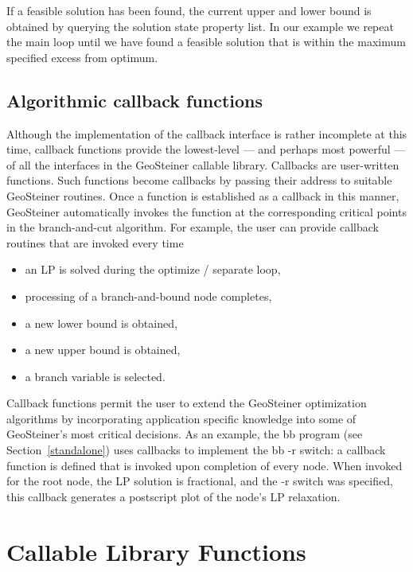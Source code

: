 \documentclass[12pt,twoside,letterpaper]{article}
\def\code#1{{\ttfamily #1}}
\def\geosteiner{Geo\-Steiner}
\begin{document}
If a feasible solution has been found, the current upper and lower
bound is obtained by querying the solution state property list. In our
example we repeat the main loop until we have found a feasible
solution that is within the maximum specified excess from optimum.


\subsection{Algorithmic callback functions}
\label{callback_interfaces}

Although the implementation of the callback interface is rather
incomplete at this time,
callback functions provide the lowest-level --- and perhaps most
powerful --- of all the interfaces in the \geosteiner{} callable
library.
Callbacks are user-written functions.
Such functions become callbacks by passing their address to suitable
\geosteiner{} routines.
Once a function is established as a callback in this manner,
\geosteiner{} automatically invokes the function at the corresponding
critical points in the branch-and-cut algorithm.
For example, the user can provide callback routines that are invoked
every time
\begin{itemize}
  \item an LP is solved during the optimize / separate loop,
  \item processing of a branch-and-bound node completes,
  \item a new lower bound is obtained,
  \item a new upper bound is obtained,
  \item a branch variable is selected.
\end{itemize}
Callback functions permit the user to extend the \geosteiner{}
optimization algorithms by incorporating application specific
knowledge into some of \geosteiner{}'s most critical decisions.
As an example, the \code{bb} program (see Section~\ref{standalone})
uses callbacks to implement the 
\code{bb -r} switch: a callback function is defined that is invoked
upon completion of every node.  When invoked for the root node, the LP
solution is fractional, and the \code{-r} switch was specified, this
callback generates a postscript plot of the node's LP relaxation.


\clearpage
\section{Callable Library Functions}
\label{libraryfunctions}
\def\adescr#1{\begin{minipage}{9cm}{\vspace{2pt}#1\vspace{2pt}}\end{minipage}}
\end{document}
